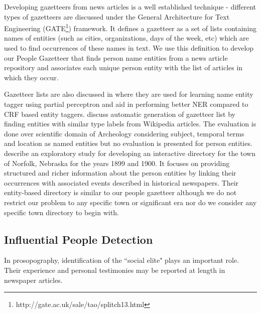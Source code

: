 Developing gazetteers from news articles is a well established technique - different types of gazetteers are discussed under the General Architecture for Text Engineering (GATE\footnote{http://gate.ac.uk/sale/tao/splitch13.html}) framework. It defines a gazetteer as a set of lists containing names of entities (such as cities, organizations, days of the week, etc) which are used to find occurrences of these names in text. We use this definition to develop our People Gazetteer that finds person name entities from a news article repository and associates each unique person entity with the list of articles in which they occur.

Gazetteer lists are also discussed in \cite{carlson2009learning} where they are used for learning name entity tagger using partial perceptron and aid in performing better NER compared to CRF based entity taggers. \cite{zhang2009novel} discuss automatic generation of gazetteer list by finding entities with similar type labels from Wikipedia articles. The evaluation is done over scientific domain of Archeology considering subject, temporal terms and location as named entities but no evaluation is presented for person entities. \cite{allen2013toward} describe an exploratory study for developing an interactive directory for the town of Norfolk, Nebraska for the years 1899 and 1900. It focuses on providing structured and richer information about the person entities by linking their occurrences with associated events described in historical newspapers. Their entity-based directory is similar to our people gazetteer although we do not restrict our problem to any specific town or significant era nor do we consider any specific town directory to begin with. 

\subsection{Influential People Detection}
In prosopography, identification of the ``social elite" plays an important role. Their experience and personal testimonies may be reported at length in newspaper articles. 

